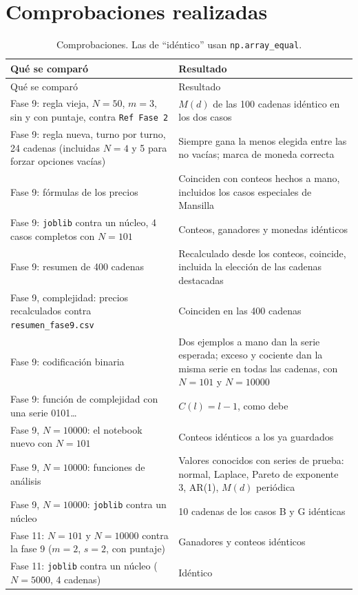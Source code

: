 \documentclass[11pt,letterpaper]{article}
\begin{document}
\section{Comprobaciones realizadas}
\begin{longtable}{p{7.6cm}p{7.6cm}}
\caption{Comprobaciones. Las de ``idéntico'' usan \texttt{np.array\_equal}.}\\
\toprule
Qué se comparó & Resultado\\
\midrule
\endfirsthead
\toprule
Qué se comparó & Resultado\\
\midrule
\endhead
\bottomrule
\endfoot
Fase 9: regla vieja, $N=50$, $m=3$, sin y con puntaje, contra \texttt{Ref Fase 2} & $M(d)$ de las 100 cadenas idéntico en los dos casos\\
Fase 9: regla nueva, turno por turno, 24 cadenas (incluidas $N=4$ y 5 para forzar opciones vacías) & Siempre gana la menos elegida entre las no vacías; marca de moneda correcta\\
Fase 9: fórmulas de los precios & Coinciden con conteos hechos a mano, incluidos los casos especiales de Mansilla\\
Fase 9: \texttt{joblib} contra un núcleo, 4 casos completos con $N=101$ & Conteos, ganadores y monedas idénticos\\
Fase 9: resumen de 400 cadenas & Recalculado desde los conteos, coincide, incluida la elección de las cadenas destacadas\\
Fase 9, complejidad: precios recalculados contra \texttt{resumen\_fase9.csv} & Coinciden en las 400 cadenas\\
Fase 9: codificación binaria & Dos ejemplos a mano dan la serie esperada; exceso y cociente dan la misma serie en todas las cadenas, con $N=101$ y $N=10000$\\
Fase 9: función de complejidad con una serie 0101\dots & $C(l)=l-1$, como debe\\
Fase 9, $N=10000$: el notebook nuevo con $N=101$ & Conteos idénticos a los ya guardados\\
Fase 9, $N=10000$: funciones de análisis & Valores conocidos con series de prueba: normal, Laplace, Pareto de exponente 3, AR(1), $M(d)$ periódica\\
Fase 9, $N=10000$: \texttt{joblib} contra un núcleo & 10 cadenas de los casos B y G idénticas\\
Fase 11: $N=101$ y $N=10000$ contra la fase 9 ($m=2$, $s=2$, con puntaje) & Ganadores y conteos idénticos\\
Fase 11: \texttt{joblib} contra un núcleo ($N=5000$, 4 cadenas) & Idéntico\\

\end{longtable}
\end{document}

